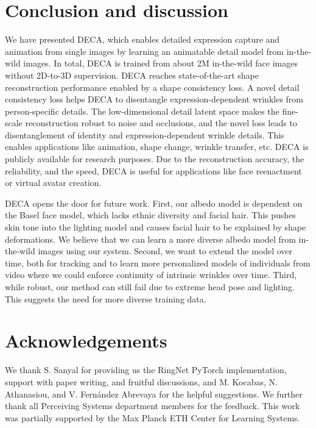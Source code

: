 \documentclass[final]{cvpr}
\newcommand{\modelname}{DECA\xspace}
\begin{document}
%
 \section{Conclusion and discussion}

We have presented \modelname, which enables detailed expression capture and animation from single images by learning an animatable detail model from in-the-wild images. 
In total, \modelname is trained from about 2M in-the-wild face images without 2D-to-3D supervision.
\modelname reaches state-of-the-art shape reconstruction performance enabled by a shape consistency loss. 
A novel detail consistency loss helps \modelname to disentangle expression-dependent wrinkles from person-specific details. 
The low-dimensional detail latent space makes the fine-scale reconstruction robust to noise and occlusions, and the novel loss leads to disentanglement of identity and expression-dependent wrinkle details. 
This enables applications like animation, shape change, wrinkle transfer, etc.
\modelname is publicly available for research purposes. 
Due to the reconstruction accuracy, the reliability, and the speed, \modelname is useful for applications like face reenactment or virtual avatar creation.

\modelname opens the door for future work.
First, our albedo model is dependent on the Basel face model, which lacks ethnic diversity and facial hair.  
This pushes skin tone into the lighting model and causes facial hair to be explained by shape deformations. 
We believe that we can learn a more diverse albedo model from in-the-wild images using our system.
Second, we want to extend the model over time, both for tracking and to learn more personalized models of individuals from video where we could enforce continuity of intrinsic wrinkles over time.
Third, while robust, our method can still fail due to extreme head pose and lighting. 
This suggests the need for more diverse training data.

 \section{Acknowledgements}
We thank S. Sanyal for providing us the RingNet PyTorch implementation, support with paper writing, and fruitful discussions, and M. Kocabas, N. Athanasiou, and V. Fernández Abrevaya for the helpful suggestions. 
We further thank all Perceiving Systems department members for the feedback. This work was partially supported by the Max Planck ETH Center for Learning Systems.
\end{document}
